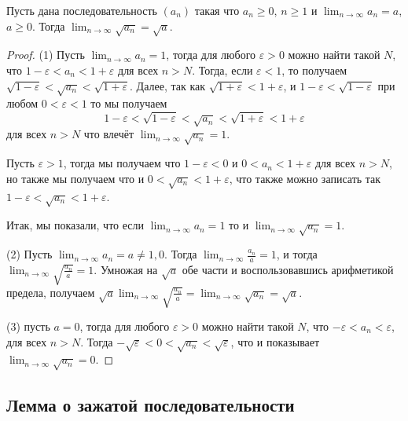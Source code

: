 \begin{proposition}
 Пусть дана последовательность $(a_n )$ такая что $a_n \ge 0$, $n\ge 1$ и $\lim_{n \to \infty} a_n = a$, $a \ge 0$. Тогда $\lim_{n \to \infty}\sqrt{a_n} = \sqrt{a}.$    
\end{proposition}
\begin{proof}
 (1) Пусть $\lim_{n \to \infty}a_n = 1$, тогда для любого $\varepsilon>0$ можно найти такой $N$, что $1 - \varepsilon <a_n<1 + \varepsilon$ для всех $n >N$. Тогда, если $\varepsilon<1$, то получаем $\sqrt{1-\varepsilon} < \sqrt{a_n} <\sqrt{1+\varepsilon}$. Далее, так как $\sqrt{1+\varepsilon} < 1 + \varepsilon$, и $1-\varepsilon < \sqrt{1-\varepsilon}$ при любом $0 <\varepsilon<1$ то мы получаем
 \[
  1 -\varepsilon < \sqrt{1-\varepsilon} < \sqrt{a_n} < \sqrt{1+\varepsilon} < 1 + \varepsilon
 \]
для всех $n > N$ что влечёт $\lim_{n \to \infty}\sqrt{a_n} =1$. 

 Пусть $\varepsilon >1$, тогда мы получаем что $1 - \varepsilon <0$ и $0 < a_n  < 1 +\varepsilon$ для всех $n >N$, но также мы получаем что и $0 < \sqrt{a_n} < 1 + \varepsilon$, что также можно записать так $1- \varepsilon < \sqrt{a_n} < 1 + \varepsilon$.

 Итак, мы показали, что если $\lim_{n \to \infty}a_n = 1$ то и $\lim_{n \to \infty}\sqrt{a_n} = 1.$

 (2) Пусть $\lim_{n \to \infty}a_n = a \ne 1,0.$ Тогда $\lim_{n \to \infty} \frac{a_n}{a} = 1$, и тогда $\lim_{n \to \infty}\sqrt{\frac{a_n}{a}} = 1$. Умножая на $\sqrt{a}$ обе части и воспользовавшись арифметикой предела, получаем $\sqrt{a} \lim_{n \to \infty}\sqrt{\frac{a_n}{a}} = \lim_{n \to \infty}\sqrt{a_n} = \sqrt{a}$.

 (3) пусть $a = 0$, тогда для любого $\varepsilon>0$ можно найти такой $N$, что $-\varepsilon < a_n <\varepsilon$, для всех $n>N$. Тогда $-\sqrt{\varepsilon} < 0 < \sqrt{a_n} < \sqrt{\varepsilon}$, что и показывает $\lim_{n\to \infty} \sqrt{a_n} = 0.$
\end{proof}


\subsection{Лемма о зажатой последовательности}

